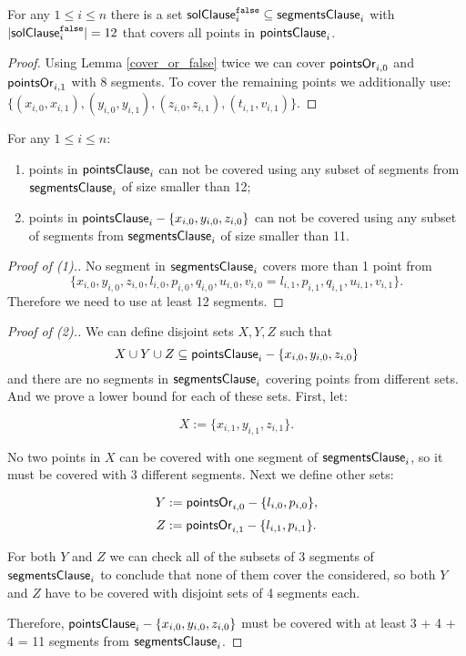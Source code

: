 \begin{lemma}
\label{cover_clauses_solution_false}
For any $1 \le i \le n$ there is
a set $\mathsf{solClause}^{\texttt{false}}_i \subseteq \mathsf{segmentsClause}_i$
with $|\mathsf{solClause}^{\texttt{false}}_i| = 12$
that covers all points in $\mathsf{pointsClause}_{i}$.
\end{lemma}

\begin{proof}
Using Lemma \ref{cover_or_false} twice we can
cover $\mathsf{pointsOr}_{i,0}$ and  $\mathsf{pointsOr}_{i,1}$
with 8 segments.
To cover the remaining points we additionally use:
$\{ (x_{i, 0}, x_{i, 1}), (y_{i, 0}, y_{i, 1}),
(z_{i, 0}, z_{i, 1}), (t_{i, 1}, v_{i, 1}) \}.$
\end{proof}

\begin{lemma}
\label{cover_clauses_segments_no_less}
For any $1 \le i \le n$:
\begin{enumerate}[label={(\arabic*)}]
	\item points in $\mathsf{pointsClause}_{i}$ can not be covered 
	using any subset of segments
	from $\mathsf{segmentsClause}_i$ of size smaller than 12;
	\item points in $\mathsf{pointsClause}_{i} - \{ x_{i, 0}, y_{i, 0}, z_{i, 0}\}$
	can not be covered using any subset of segments
	from $\mathsf{segmentsClause}_i$ of size smaller than 11.
\end{enumerate}
\end{lemma}


\begin{proof}[Proof of (1).]
No segment in $\mathsf{segmentsClause}_i$ covers more than 1 point from
$$\{ x_{i, 0}, y_{i, 0}, z_{i, 0}, l_{i, 0}, p_{i, 0}, q_{i, 0},
u_{i, 0}, v_{i, 0} = l_{i, 1}, p_{i, 1}, q_{i, 1}, u_{i, 1}, v_{i, 1} \}.$$
Therefore we need to use at least 12 segments.
\end{proof}

\begin{proof}[Proof of (2).]

We can define disjoint sets $X, Y, Z$ such that
$$X \cup Y \cup Z \subseteq \mathsf{pointsClause}_{i} - \{x_{i, 0}, y_{i, 0}, z_{i, 0}\}$$
and there are no segments in $\mathsf{segmentsClause}_i$ covering points from different sets.
And we prove a lower bound for each of these sets.
First, let:

$$X := \{x_{i, 1}, y_{i, 1}, z_{i, 1}\}.$$

No two points in $X$ can be covered with one segment
of $\mathsf{segmentsClause}_i$, so it must be covered with 3 different segments.
Next we define other sets:

$$Y := \mathsf{pointsOr}_{i,0} - \{l_{i, 0}, p_{i, 0}\},$$
$$Z := \mathsf{pointsOr}_{i,1} - \{l_{i, 1}, p_{i, 1}\}.$$


For both $Y$ and $Z$ we can check all of the subsets of 3 segments
of $\mathsf{segmentsClause}_i$
to conclude that none of them cover the considered,
so both $Y$ and $Z$ have to be covered with 
disjoint sets of 4 segments each.

Therefore, $\mathsf{pointsClause}_{i} - \{x_{i, 0}, y_{i, 0}, z_{i, 0}\}$
must be covered with at least 3 + 4 + 4 = 11 segments from $\mathsf{segmentsClause}_i$.
\end{proof}

